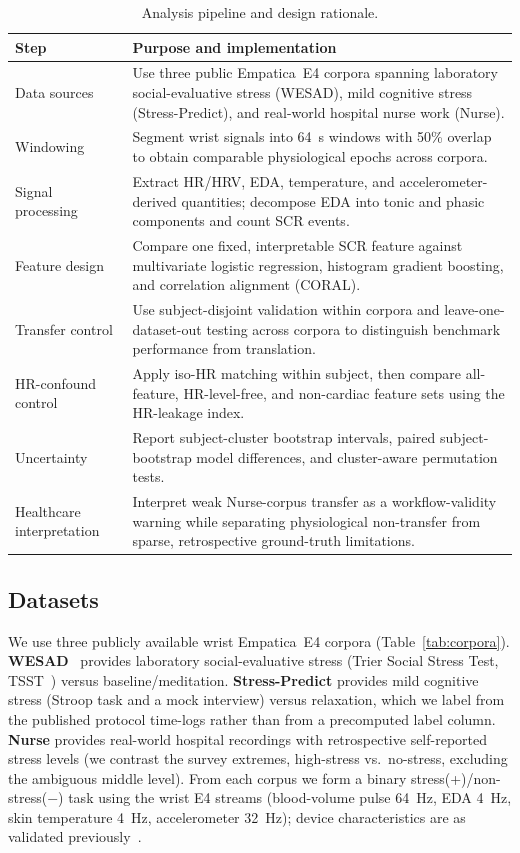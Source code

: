 \documentclass[healthcare,article,submit,moreauthors,pdftex]{Definitions/mdpi}
\begin{document}
\begin{table}[H]
\centering
\caption{Analysis pipeline and design rationale.\label{tab:pipeline}}
\begin{tabular}{p{}p{}}
\toprule
\textbf{Step} & \textbf{Purpose and implementation} \\
\midrule
Data sources &
Use three public Empatica~E4 corpora spanning laboratory social-evaluative stress
(WESAD), mild cognitive stress (Stress-Predict), and real-world hospital nurse
work (Nurse). \\
Windowing &
Segment wrist signals into 64~s windows with 50\% overlap to obtain comparable
physiological epochs across corpora. \\
Signal processing &
Extract HR/HRV, EDA, temperature, and accelerometer-derived quantities; decompose
EDA into tonic and phasic components and count SCR events. \\
Feature design &
Compare one fixed, interpretable SCR feature against multivariate logistic
regression, histogram gradient boosting, and correlation alignment (CORAL). \\
Transfer control &
Use subject-disjoint validation within corpora and leave-one-dataset-out testing
across corpora to distinguish benchmark performance from translation. \\
HR-confound control &
Apply iso-HR matching within subject, then compare all-feature, HR-level-free, and
non-cardiac feature sets using the HR-leakage index. \\
Uncertainty &
Report subject-cluster bootstrap intervals, paired subject-bootstrap model
differences, and cluster-aware permutation tests. \\
Healthcare interpretation &
Interpret weak Nurse-corpus transfer as a workflow-validity warning while
separating physiological non-transfer from sparse, retrospective ground-truth
limitations. \\
\bottomrule
\end{tabular}
\end{table}

\subsection{Datasets}

We use three publicly available wrist Empatica~E4 corpora
(Table~\ref{tab:corpora}). \textbf{WESAD}~\cite{schmidt2018wesad} provides
laboratory social-evaluative stress (Trier Social Stress Test,
TSST~\cite{kirschbaum1993tsst}) versus baseline/meditation. \textbf{Stress-Predict}
\cite{talukdar2022stresspredict} provides mild cognitive stress (Stroop task and
a mock interview) versus relaxation, which we label from the published protocol
time-logs rather than from a precomputed label column. \textbf{Nurse}
\cite{hosseini2022nurse} provides real-world hospital recordings with
retrospective self-reported stress levels (we contrast the survey extremes,
high-stress vs.\ no-stress, excluding the ambiguous middle level). From each
corpus we form a binary stress(+)/non-stress($-$) task using the wrist E4 streams
(blood-volume pulse 64~Hz, EDA 4~Hz, skin temperature 4~Hz, accelerometer
32~Hz); device characteristics are as validated previously~\cite{mccarthy2016e4}.
\end{document}
